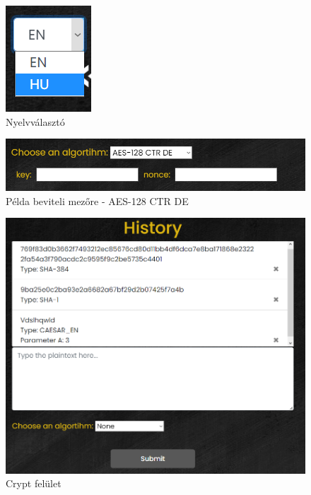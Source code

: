 \newpage
\begin{figure}[!h]
	\centering
	\includegraphics[scale=1]{images/langSelector}
	\caption{Nyelvválasztó}
	\label{fig:langSelector}
\end{figure}

\begin{figure}[!h]
	\centering
	\includegraphics[scale=0.5]{images/aesDeOptions}
	\caption{Példa beviteli mezőre - AES-128 CTR DE}
	\label{fig:aesDeOpt}
\end{figure}

\begin{figure}[!h]
	\centering
	\includegraphics[scale=0.45]{images/cryptBase}
	\caption{Crypt felület}
	\label{fig:cryptBase}
\end{figure}
